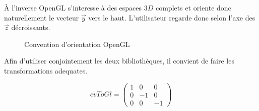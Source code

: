 \documentclass[10pt,a4paper,twoside, twocolumn]{report}
\newcommand*{\rootPath}{../}
\begin{document}
À l'inverse OpenGL s'interesse à des espaces $3D$ complets et oriente donc naturellement le vecteur $\vec y$ vers le haut. L'utilisateur regarde donc selon l'axe des $\vec z$ décroissants.

\begin{figure}[!ht]
	\centering
	
	\caption{Convention d'orientation OpenGL}
	\label{fig:tikz:space-opengl}
\end{figure}

Afin d'utiliser conjointement les deux bibliothèques, il convient de faire les transformations adequates.

\begin{equation}
	cvToGl = \begin{pmatrix}1 & 0 & 0 \\ 0 & -1 & 0 \\ 0 & 0 & -1\end{pmatrix}
\end{equation}

\ifstandalone
	
	
\fi
\end{document}
